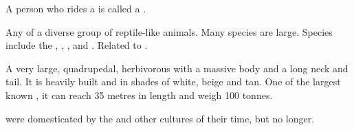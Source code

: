 \begin{gloss}
A person who rides a \relc{} is called a \relcer{}. 








\begin{comment}
\paragraph{\saurian}
\end{comment}
\gitem{\saurian}
Any of a diverse group of reptile-like animals. 
Many species are large. 
Species include the , , ,  and . 
Related to . 








\begin{comment}
\paragraph{\tondra}
\end{comment}
\gitem{\tondra}
A very large, quadrupedal, herbivorous  with a massive body and a long neck and tail. 
It is heavily built and \coloured in shades of white, beige and tan. 
One of the largest known \saurians, it can reach 35 metres in length and weigh 100 tonnes. 

\Tondras{} were domesticated by the  and other cultures of their time, but no longer. 




\end{gloss}



















